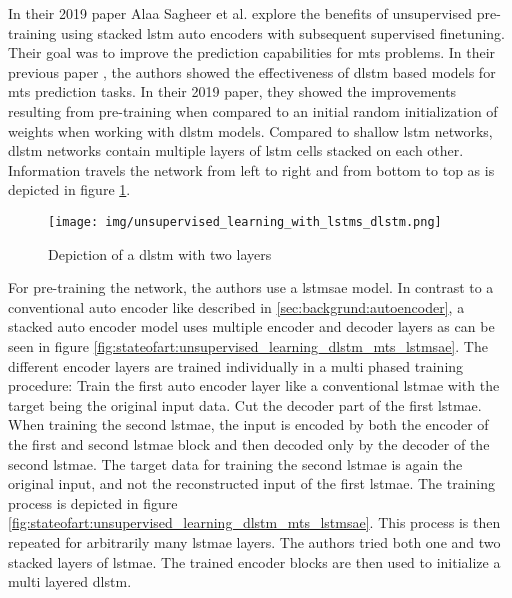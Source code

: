 In their 2019 paper \cite{unsupervised_learning_lstms_timeseries} Alaa Sagheer et al. explore the benefits of unsupervised pre-training using stacked \gls{lstm} auto encoders with subsequent supervised finetuning. Their goal was to improve the prediction capabilities for \gls{mts} problems. In their previous paper \cite{dlstm_time_series_forecasting}, the authors showed the effectiveness of \gls{dlstm} based models for \gls{mts} prediction tasks. In their 2019 paper, they showed the improvements resulting from pre-training when compared to an initial random initialization of weights when working with \gls{dlstm} models. Compared to shallow \gls{lstm} networks, \gls{dlstm} networks contain multiple layers of \gls{lstm} cells stacked on each other. Information travels the network from left to right and from bottom to top as is depicted in figure \ref{fig:stateofart:unsupervised_learning_with_lstms_dlstm}. 

\begin{figure}[h]
	\centering
	\texttt{[image: img/unsupervised\_learning\_with\_lstms\_dlstm.png]}
	\caption{Depiction of a \gls{dlstm} with two layers \cite{unsupervised_learning_lstms}}
	\label{fig:stateofart:unsupervised_learning_with_lstms_dlstm}
\end{figure}

For pre-training the network, the authors use a \gls{lstmsae} model. In contrast to a conventional auto encoder like described in \ref{sec:backgrund:autoencoder}, a stacked auto encoder model uses multiple encoder and decoder layers as can be seen in figure \ref{fig:stateofart:unsupervised_learning_dlstm_mts_lstmsae}. The different encoder layers are trained individually in a multi phased training procedure: Train the first auto encoder layer like a conventional \gls{lstmae} with the target being the original input data. Cut the decoder part of the first \gls{lstmae}. When training the second \gls{lstmae}, the input is encoded by both the encoder of the first and second \gls{lstmae} block and then decoded only by the decoder of the second \gls{lstmae}. The target data for training the second \gls{lstmae} is again the original input, and not the reconstructed input of the first \gls{lstmae}. The training process is depicted in figure \ref{fig:stateofart:unsupervised_learning_dlstm_mts_lstmsae}. This process is then repeated for arbitrarily many \gls{lstmae} layers. The authors tried both one and two stacked layers of \gls{lstmae}. The trained encoder blocks are then used to initialize a multi layered \gls{dlstm}.

